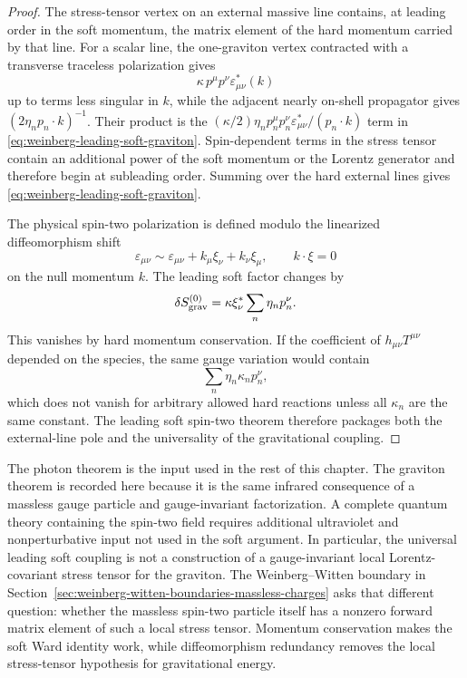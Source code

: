 \begin{proof}
The stress-tensor vertex on an external massive line contains, at leading
order in the soft momentum, the matrix element of the hard momentum carried by
that line.  For a scalar line, the one-graviton vertex contracted with a
transverse traceless polarization gives
\[
  \kappa\,
  p^\mu p^\nu\varepsilon_{\mu\nu}^*(k)
\]
up to terms less singular in \(k\), while the adjacent nearly on-shell
propagator gives \((2\eta_n p_n\cdot k)^{-1}\).  Their product is the
\((\kappa/2)\eta_n p_n^\mu p_n^\nu\varepsilon_{\mu\nu}^*/(p_n\cdot k)\)
term in \eqref{eq:weinberg-leading-soft-graviton}.  Spin-dependent terms in
the stress tensor contain an additional power of the soft momentum or the
Lorentz generator and therefore begin at subleading order.  Summing over the
hard external lines gives \eqref{eq:weinberg-leading-soft-graviton}.

The physical spin-two polarization is defined modulo the linearized
diffeomorphism shift
\[
  \varepsilon_{\mu\nu}\sim
  \varepsilon_{\mu\nu}
  +k_\mu\xi_\nu+k_\nu\xi_\mu ,
  \qquad
  k\cdot\xi=0
\]
on the null momentum \(k\).  The leading soft factor changes by
\[
  \delta S_{\rm grav}^{(0)}
  =
  \kappa
  \xi_\nu^*
  \sum_n\eta_n p_n^\nu .
\]
This vanishes by hard momentum conservation.  If the coefficient of
\(h_{\mu\nu}T^{\mu\nu}\) depended on the species, the same gauge variation
would contain
\[
  \sum_n\eta_n\kappa_n p_n^\nu ,
\]
which does not vanish for arbitrary allowed hard reactions unless all
\(\kappa_n\) are the same constant.  The leading soft spin-two theorem
therefore packages both the external-line pole and the universality of the
gravitational coupling.
\end{proof}

The photon theorem is the input used in the rest of this chapter.  The
graviton theorem is recorded here because it is the same infrared consequence
of a massless gauge particle and gauge-invariant factorization.  A complete
quantum theory containing the spin-two field requires additional ultraviolet
and nonperturbative input not used in the soft argument.
In particular, the universal leading soft coupling is not a construction of a
gauge-invariant local Lorentz-covariant stress tensor for the graviton.  The
Weinberg--Witten boundary in
Section~\ref{sec:weinberg-witten-boundaries-massless-charges} asks that
different question: whether the massless spin-two particle itself has a
nonzero forward matrix element of such a local stress tensor.  Momentum
conservation makes the soft Ward identity work, while diffeomorphism
redundancy removes the local stress-tensor hypothesis for gravitational
energy.

